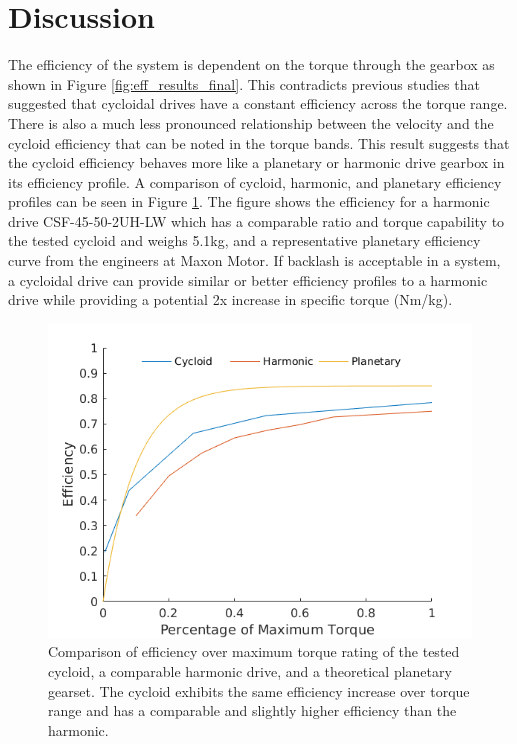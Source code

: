 \section{Discussion} \label{ch:single:discussion}

The efficiency of the system is dependent on the torque through the gearbox as shown in Figure \ref{fig:eff_results_final}.
This contradicts previous studies that suggested that cycloidal drives have a constant efficiency across the torque range.
There is also a much less pronounced relationship between the velocity and the cycloid efficiency that can be noted in the torque bands.
This result suggests that the cycloid efficiency behaves more like a planetary or harmonic drive gearbox in its efficiency profile.
A comparison of cycloid, harmonic, and planetary efficiency profiles can be seen in Figure \ref{fig:eff_comp}.
The figure shows the efficiency for a harmonic drive CSF-45-50-2UH-LW \cite{ref:harmonic_sheet} which has a comparable ratio and torque capability to the tested cycloid and weighs 5.1kg, and a representative planetary efficiency curve from the engineers at Maxon Motor.
If backlash is acceptable in a system, a cycloidal drive can provide similar or better efficiency profiles to a harmonic drive while providing a potential 2x increase in specific torque (Nm/kg).

\begin{figure}[t]
   \centering
   \includegraphics[width=0.7\linewidth]{fig/eff_comp_v3}
   \caption{Comparison of efficiency over maximum torque rating of the tested cycloid, a comparable harmonic drive, and a theoretical planetary gearset.
   The cycloid exhibits the same efficiency increase over torque range and has a comparable and slightly higher efficiency than the harmonic.}
   \label{fig:eff_comp}
\end{figure}

